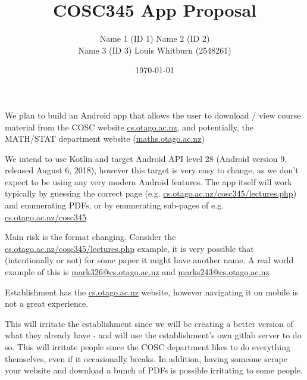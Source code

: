 \documentclass{article}
\title{COSC345 App Proposal}
\author{Name 1 (ID 1) Name 2 (ID 2) \\ Name 3 (ID 3) Louis Whitburn (2548261)}
\date{\today}
\begin{document}
	\maketitle
	
	We plan to build an Android app that allows the user to download / view course material from the COSC website \url{cs.otago.ac.nz}, and potentially, the MATH/STAT department website (\url{maths.otago.ac.nz})
	
	We intend to use Kotlin and target Android API level 28 (Android version 9, released August 6, 2018), however this target is very easy to change, as we don't expect to be using any very modern Android features. The app itself will work typically by guessing the correct page (e.g. \url{cs.otago.ac.nz/cosc345/lectures.php}) and enumerating PDFs, or by enumerating sub-pages of e.g. \url{cs.otago.ac.nz/cosc345}
	
	Main risk is the format changing. Consider the \url{cs.otago.ac.nz/cosc345/lectures.php} example, it is very possible that (intentionally or not) for some paper it might have another name. A real world example of this is \url{mark326@cs.otago.ac.nz} and \url{marks243@cs.otago.ac.nz}
	
	Establishment has the \url{cs.otago.ac.nz} website, however navigating it on mobile is not a great experience.
	
	This will irritate the establishment since we will be creating a better version of what they already have - and will use the establishment's own gitlab server to do so. This will irritate people since the COSC department likes to do everything themselves, even if it occasionally breaks. In addition, having someone scrape your website and download a bunch of PDFs is possible irritating to some people.
\end{document}
